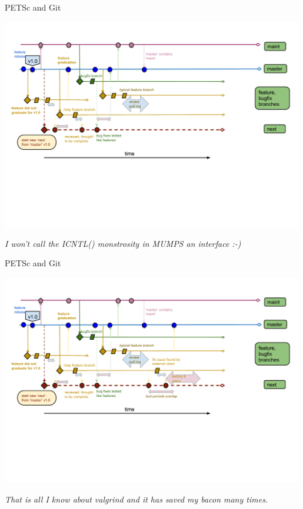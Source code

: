 \begin{frame}{PETSc and Git}
  \begin{center}
    \includegraphics[width=0.99\textwidth]{figures/gitworkflows-75}
  \end{center}
  \begin{flushright} \vspace*{-0.5cm}
   \textit{I won't call the ICNTL() monstrosity in MUMPS an interface :-)}
  \end{flushright}
\end{frame}

\begin{frame}{PETSc and Git}
  \begin{center}
    \includegraphics[width=0.99\textwidth]{figures/gitworkflows-80}
  \end{center}
  \begin{flushright} \vspace*{-0.5cm}
   \textit{That is all I know about valgrind and it has saved my bacon many times.}
  \end{flushright}
\end{frame}

